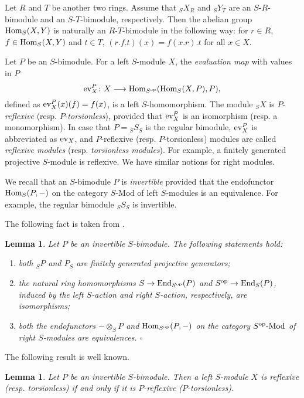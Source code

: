 \documentclass[a4paper]{amsart}
\newtheorem{lem}[thm]{Lemma}
\theoremstyle{definition}
\theoremstyle{remark}
\numberwithin{equation}{section}
\begin{document}
Let $R$ and $T$ be another two rings. Assume that $_SX_R$ and $_SY_T$ are an $S$-$R$-bimodule and
an $S$-$T$-bimodule, respectively. Then the abelian group ${\rm Hom}_S(X, Y)$ is naturally an
$R$-$T$-bimodule in the following way: for $r\in R$, $f\in {\rm Hom}_S(X, Y)$ and $t\in T$,
$(r.f.t)(x)=f(x.r).t$ for all $x\in X$.

Let $P$ be an $S$-bimodule. For a left $S$-module $X$,  the \emph{evaluation map} with values in $P$
$${\rm ev}^P_X\colon X\longrightarrow {\rm Hom}_{S^{\rm op}}({\rm Hom}_S(X, P), P),$$
 defined as ${\rm ev}^P_X(x)(f)=f(x)$, is a left $S$-homomorphism. The module $_SX$ is $P$-\emph{reflexive} (resp. $P$-\emph{torsionless}), provided that
 ${\rm ev}^P_X$ is an isomorphism (resp. a monomorphism). In case that $P={_SS_S}$ is the regular bimodule, ${\rm ev}_X^P$ is abbreviated as ${\rm ev}_X$, and $P$-reflexive (resp. $P$-torsionless) modules are called  \emph{reflexive modules} (resp. \emph{torsionless modules}).  For example, a finitely generated projective $S$-module is reflexive. We have similar notions for right modules.

 We recall that an $S$-bimodule $P$ is \emph{invertible} provided that the endofunctor ${\rm Hom}_S(P, -)$ on the
 category $S\mbox{-Mod}$ of left $S$-modules is an equivalence. For example, the regular bimodule $_SS_S$ is
 invertible.

 The following fact is taken from  \cite[Chapter 12]{Fai73}.

 \begin{lem}\label{lem:inv}
 Let $P$ be an invertible $S$-bimodule. The following statements hold:
 \begin{enumerate}
 \item both $_SP$ and $P_S$ are finitely generated projective generators;
 \item  the natural ring homomorphisms $S\rightarrow {\rm End}_{S^{\rm op}}(P)$ and $S^{\rm op}\rightarrow {\rm End}_{S}(P)$,
 induced by the left $S$-action and right $S$-action, respectively, are isomorphisms;
 \item  both the endofunctors $-\otimes_SP$ and ${\rm Hom}_{S^{\rm op}}(P, -)$ on  the category $S^{\rm op}\mbox{-{\rm Mod}}$ of right $S$-modules are  equivalences. \hfill $\square$
 \end{enumerate}
 \end{lem}

The following result is well known.

\begin{lem}\label{lem:wellknown}
Let $P$ be an invertible $S$-bimodule. Then a left $S$-module $X$ is reflexive (resp. torsionless) if and only if it is $P$-reflexive ($P$-torsionless).
\end{lem}
\end{document}
